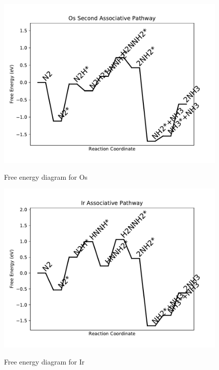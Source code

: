 \documentclass{article}
\begin{document}
\newpage
\begin{figure}
\includegraphics[width=1\linewidth]{data/plots/Os_associative_2.pdf}
\label{fig:Os_associative_2}
\caption{Free energy diagram for Os}
\end{figure}

\begin{figure}
\includegraphics[width=1\linewidth]{data/plots/Ir_associative.pdf}
\label{fig:Ir_associative}
\caption{Free energy diagram for Ir}
\end{figure}
\end{document}
